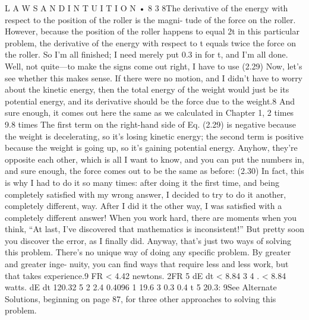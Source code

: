 \documentclass[10pt,oneside]{article}
\begin{document}
L A W S  A N D  I N T U I T I O N • 8 3 8The derivative of the energy with respect to the position of the roller is the magni- tude of the force on the roller. However, because the position of the roller happens to equal 2t in this particular problem, the derivative of the energy with respect to t equals twice the force on the roller. So I’m all finished; I need merely put 0.3 in for t, and I’m all done. Well, not quite---to make the signs come out right, I have to use (2.29) Now, let’s see whether this makes sense. If there were no motion, and I didn’t have to worry about the kinetic energy, then the total energy of the weight would just be its potential energy, and its derivative should be the force due to the weight.8 And sure enough, it comes out here the same as we calculated in Chapter 1, 2 times 9.8 times The first term on the right-hand side of Eq. (2.29) is negative because the weight is decelerating, so it’s losing kinetic energy; the second term is positive because the weight is going up, so it’s gaining potential energy. Anyhow, they’re opposite each other, which is all I want to know, and you can put the numbers in, and sure enough, the force comes out to be the same as before: (2.30) In fact, this is why I had to do it so many times: after doing it the first time, and being completely satisfied with my wrong answer, I decided to try to do it another, completely different, way. After I did it the other way, I was satisfied with a completely different answer! When you work hard, there are moments when you think, “At last, I’ve discovered that mathematics is inconsistent!” But pretty soon you discover the error, as I finally did. Anyway, that’s just two ways of solving this problem. There’s no unique way of doing any specific problem. By greater and greater inge- nuity, you can find ways that require less and less work, but that takes experience.9 FR < 4.42 newtons. 2FR 5 dE dt < 8.84 3 4 . < 8.84 watts. dE dt 120.32 5 2 2.4 0.4096 1 19.6 3 0.3 0.4 t 5 20.3: 9See Alternate Solutions, beginning on page 87, for three other approaches to solving this problem.\par
\end{document}
